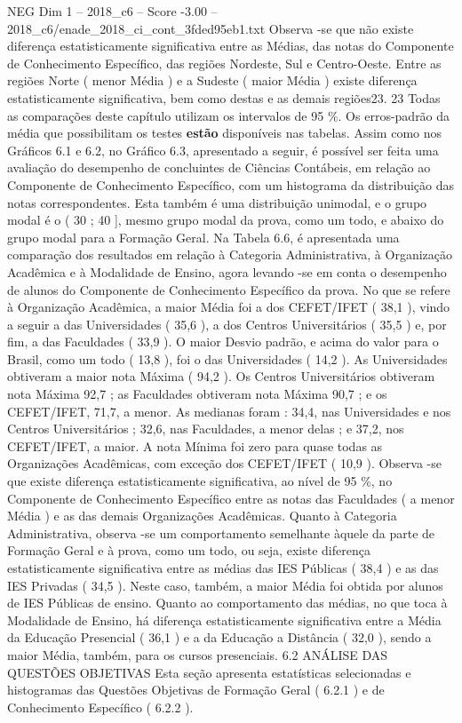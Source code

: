 \begin{textsample}{NEG Dim 1 – 2018\_c6 – Score -3.00 – 2018\_c6/enade\_2018\_ci\_cont\_3fded95eb1.txt}
Observa -se que não existe diferença estatisticamente significativa entre as Médias, das notas do Componente de Conhecimento Específico, das regiões Nordeste, Sul e Centro-Oeste.
Entre as regiões Norte ( menor Média ) e a Sudeste ( maior Média ) existe diferença estatisticamente significativa, bem como destas e as demais regiões23. 23 Todas as comparações deste capítulo utilizam os intervalos de 95 \%.
Os erros-padrão da média que possibilitam os testes \textbf{estão} disponíveis nas tabelas.
Assim como nos Gráficos 6.1 e 6.2, no Gráfico 6.3, apresentado a seguir, é possível ser feita uma avaliação do desempenho de concluintes de Ciências Contábeis, em relação ao Componente de Conhecimento Específico, com um histograma da distribuição das notas correspondentes.
Esta também é uma distribuição unimodal, e o grupo modal é o ( 30 ; 40 ], mesmo grupo modal da prova, como um todo, e abaixo do grupo modal para a Formação Geral.
Na Tabela 6.6, é apresentada uma comparação dos resultados em relação à Categoria Administrativa, à Organização Acadêmica e à Modalidade de Ensino, agora levando -se em conta o desempenho de alunos do Componente de Conhecimento Específico da prova.
No que se refere à Organização Acadêmica, a maior Média foi a dos CEFET/IFET ( 38,1 ), vindo a seguir a das Universidades ( 35,6 ), a dos Centros Universitários ( 35,5 ) e, por fim, a das Faculdades ( 33,9 ).
O maior Desvio padrão, e acima do valor para o Brasil, como um todo ( 13,8 ), foi o das Universidades ( 14,2 ).
As Universidades obtiveram a maior nota Máxima ( 94,2 ).
Os Centros Universitários obtiveram nota Máxima 92,7 ; as Faculdades obtiveram nota Máxima 90,7 ; e os CEFET/IFET, 71,7, a menor.
As medianas foram : 34,4, nas Universidades e nos Centros Universitários ; 32,6, nas Faculdades, a menor delas ; e 37,2, nos CEFET/IFET, a maior.
A nota Mínima foi zero para quase todas as Organizações Acadêmicas, com exceção dos CEFET/IFET ( 10,9 ).
Observa -se que existe diferença estatisticamente significativa, ao nível de 95 \%, no Componente de Conhecimento Específico entre as notas das Faculdades ( a menor Média ) e as das demais Organizações Acadêmicas.
Quanto à Categoria Administrativa, observa -se um comportamento semelhante àquele da parte de Formação Geral e à prova, como um todo, ou seja, existe diferença estatisticamente significativa entre as médias das IES Públicas ( 38,4 ) e as das IES Privadas ( 34,5 ).
Neste caso, também, a maior Média foi obtida por alunos de IES Públicas de ensino.
Quanto ao comportamento das médias, no que toca à Modalidade de Ensino, há diferença estatisticamente significativa entre a Média da Educação Presencial ( 36,1 ) e a da Educação a Distância ( 32,0 ), sendo a maior Média, também, para os cursos presenciais. 6.2 ANÁLISE DAS QUESTÕES OBJETIVAS Esta seção apresenta estatísticas selecionadas e histogramas das Questões Objetivas de Formação Geral ( 6.2.1 ) e de Conhecimento Específico ( 6.2.2 ).

\end{textsample}
